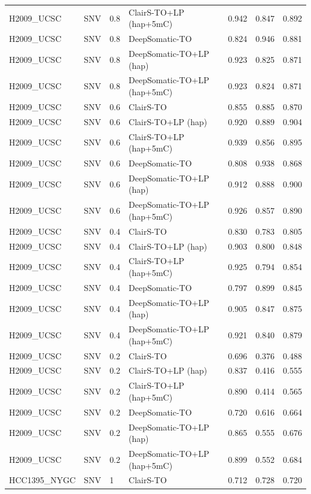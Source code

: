 \documentclass[pdflatex,sn-nature]{sn-jnl}
\begin{document}
{\begin{longtable}{@{}llllccc@{}}
  H2009\_UCSC & SNV & 0.8 & ClairS-TO+LP (hap+5mC) & 0.942 & 0.847 & 0.892 \\
  H2009\_UCSC & SNV & 0.8 & DeepSomatic-TO & 0.824 & 0.946 & 0.881 \\
  H2009\_UCSC & SNV & 0.8 & DeepSomatic-TO+LP (hap) & 0.923 & 0.825 & 0.871 \\
  H2009\_UCSC & SNV & 0.8 & DeepSomatic-TO+LP (hap+5mC) & 0.923 & 0.824 & 0.871 \\
  H2009\_UCSC & SNV & 0.6 & ClairS-TO & 0.855 & 0.885 & 0.870 \\
  H2009\_UCSC & SNV & 0.6 & ClairS-TO+LP (hap) & 0.920 & 0.889 & 0.904 \\
  H2009\_UCSC & SNV & 0.6 & ClairS-TO+LP (hap+5mC) & 0.939 & 0.856 & 0.895 \\
  H2009\_UCSC & SNV & 0.6 & DeepSomatic-TO & 0.808 & 0.938 & 0.868 \\
  H2009\_UCSC & SNV & 0.6 & DeepSomatic-TO+LP (hap) & 0.912 & 0.888 & 0.900 \\
  H2009\_UCSC & SNV & 0.6 & DeepSomatic-TO+LP (hap+5mC) & 0.926 & 0.857 & 0.890 \\
  H2009\_UCSC & SNV & 0.4 & ClairS-TO & 0.830 & 0.783 & 0.805 \\
  H2009\_UCSC & SNV & 0.4 & ClairS-TO+LP (hap) & 0.903 & 0.800 & 0.848 \\
  H2009\_UCSC & SNV & 0.4 & ClairS-TO+LP (hap+5mC) & 0.925 & 0.794 & 0.854 \\
  H2009\_UCSC & SNV & 0.4 & DeepSomatic-TO & 0.797 & 0.899 & 0.845 \\
  H2009\_UCSC & SNV & 0.4 & DeepSomatic-TO+LP (hap) & 0.905 & 0.847 & 0.875 \\
  H2009\_UCSC & SNV & 0.4 & DeepSomatic-TO+LP (hap+5mC) & 0.921 & 0.840 & 0.879 \\
  H2009\_UCSC & SNV & 0.2 & ClairS-TO & 0.696 & 0.376 & 0.488 \\
  H2009\_UCSC & SNV & 0.2 & ClairS-TO+LP (hap) & 0.837 & 0.416 & 0.555 \\
  H2009\_UCSC & SNV & 0.2 & ClairS-TO+LP (hap+5mC) & 0.890 & 0.414 & 0.565 \\
  H2009\_UCSC & SNV & 0.2 & DeepSomatic-TO & 0.720 & 0.616 & 0.664 \\
  H2009\_UCSC & SNV & 0.2 & DeepSomatic-TO+LP (hap) & 0.865 & 0.555 & 0.676 \\
  H2009\_UCSC & SNV & 0.2 & DeepSomatic-TO+LP (hap+5mC) & 0.899 & 0.552 & 0.684 \\
  HCC1395\_NYGC & SNV & 1 & ClairS-TO & 0.712 & 0.728 & 0.720 \\

\end{longtable}}
\end{document}
